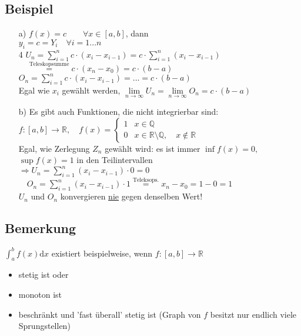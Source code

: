\documentclass[12pt, titlepage]{article}
\newcommand{\R}{\mathds{R}}
\newcommand{\infn}{n\rightarrow\infty}
\renewcommand{\>}{\rightarrow}
\renewcommand{\*}{\cdot}
\begin{document}
	\subsection{Beispiel}
	\begin{itemize}
		\item[a)] $f(x)=c\qquad\forall x \in[a,b]$, dann\\
		$y_i=c=Y_i\quad\forall i=1...n$\\4
		$U_n=\sum_{i=1}^{n}c\*(x_i-x_{i-1})=c\*\sum_{i=1}^{n}(x_i-x_{i-1})$\\
		$\quad\overset{\textrm{Teleskopsumme}}{=}c\*(x_n-x_0)=c\*(b-a)$\\
		$O_n=\sum_{i=1}^{n}c\*(x_i-x_{i-1})=...=c\*(b-a)$\\
		Egal wie $x_i$ gewählt werden, $\lim\limits_{\infn}U_n=\lim\limits_{\infn}O_n=c\*(b-a)$
		\item[b)] Es gibt auch Funktionen, die nicht integrierbar sind:\\
		$f\colon[a,b]\>\R,\quad f(x)=\begin{cases}1&x\in\mathds{Q}\\
		0&x\in\R\setminus\mathds{Q},\quad x\notin\R
		\end{cases}$\\
		Egal, wie Zerlegung $Z_n$ gewählt wird: es ist immer $\inf f(x)=0,$\\
		$ \sup f(x)=1$ in den Teilintervallen\\
		$\Rightarrow U_n=\sum_{i=1}^{n}(x_i-x_{i-1})\*0=0$\\
		$\quad O_n=\sum_{i=1}^{n}(x_i-x_{i-1})\*1\overset{\textrm{Teleksops.}}{=}x_n-x_0=1-0=1$\\
		$U_n$ und $O_n$ konvergieren \underline{nie} gegen denselben Wert!		
	\end{itemize}
	\subsection{Bemerkung}
	$\int_{a}^{b}f(x)\textrm{d}x$ existiert beispielweise, wenn $f\colon[a,b]\>\R$
	\begin{itemize}
		\item stetig ist oder
		\item monoton ist
		\item beschränkt und 'fast überall' stetig ist (Graph von $f$ besitzt nur endlich viele Sprungstellen)
	\end{itemize}
\end{document}
